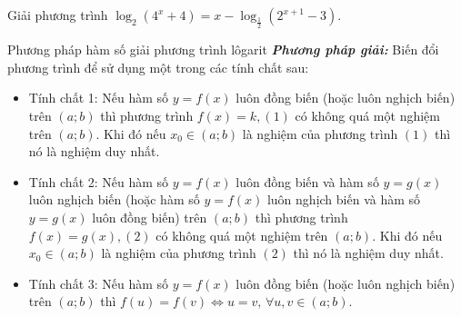 \begin{bt}%
	Giải phương trình $\log_2\left(4^x+4\right)=x-\log_{\tfrac{1}{2}}\left({2}^{x+1}-3\right).$
\end{bt}






\begin{dang}{Phương pháp hàm số giải phương trình lôgarit}
\textbf{\textit{Phương pháp giải:}}
Biến đổi phương trình để sử dụng một trong các tính chất sau: 
\begin{itemize}
\item Tính chất 1: Nếu hàm số $y=f(x)$ luôn đồng biến (hoặc luôn nghịch biến) trên $\left(a;b\right)$ thì phương trình $f(x)=k,(1)$ có không quá một nghiệm trên $\left(a;b\right)$. Khi đó nếu $x_0\in \left(a;b\right)$ là nghiệm của phương trình $(1)$ thì nó là nghiệm duy nhất.
\item Tính chất 2: Nếu hàm số $y=f(x)$ luôn đồng biến và hàm số $y=g(x)$ luôn nghịch biến (hoặc hàm số $y=f(x)$ luôn nghịch biến và hàm số $y=g(x)$ luôn đồng biến) trên $\left(a;b\right)$ thì phương trình $f(x)=g(x),(2)$ có không quá một nghiệm trên $\left(a;b\right)$. Khi đó nếu $x_0\in \left(a;b\right)$ là nghiệm của phương trình $(2)$ thì nó là nghiệm duy nhất.
\item Tính chất 3: Nếu hàm số $y=f(x)$ luôn đồng biến (hoặc luôn nghịch biến) trên $\left(a;b\right)$ thì $f(u)=f(v)\Leftrightarrow u=v,\,\forall u,v\in \left(a;b\right)$.
\end{itemize}
\end{dang}


